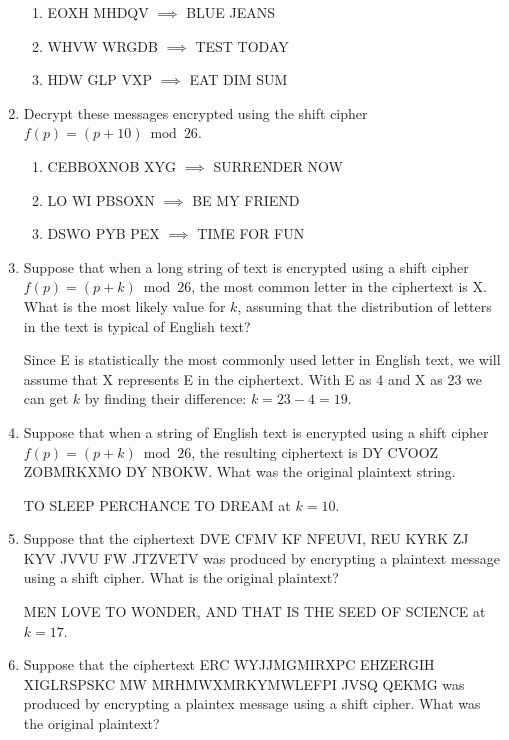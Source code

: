 \documentclass[11pt]{article}
\begin{document}
\begin{enumerate}[label=\textbf{\arabic*.}]
	\begin{enumerate}[label=\textbf{\alph*)}]
		\item EOXH MHDQV $\implies$ BLUE JEANS
		\item WHVW WRGDB $\implies$ TEST TODAY
		\item HDW GLP VXP $\implies$ EAT DIM SUM
	\end{enumerate}

	\item Decrypt these messages encrypted using the shift cipher $f(p) = (p + 10) \bmod 26$.
	
	\begin{enumerate}[label=\textbf{\alph*)}]
		\item CEBBOXNOB XYG $\implies$ SURRENDER NOW
		\item LO WI PBSOXN $\implies$ BE MY FRIEND
		\item DSWO PYB PEX $\implies$ TIME FOR FUN
	\end{enumerate}

	\item Suppose that when a long string of text is encrypted using a shift cipher $f(p) = (p + k) \bmod 26$, the most common letter in the ciphertext is X. What is the most likely value for $k$, assuming that the distribution of letters in the text is typical of English text?
	
	Since E is statistically the most commonly used letter in English text, we will assume that X represents E in the ciphertext. With E as 4 and X as 23 we can get $k$ by finding their difference: $k = 23 - 4 = 19$.
	
	\item Suppose that when a string of English text is encrypted using a shift cipher $f(p) = (p + k) \bmod 26$, the resulting ciphertext is DY CVOOZ ZOBMRKXMO DY NBOKW. What was the original plaintext string.
	
	TO SLEEP PERCHANCE TO DREAM at $k = 10$.
	
	\item Suppose that the ciphertext DVE CFMV KF NFEUVI, REU KYRK ZJ KYV JVVU FW JTZVETV was produced by encrypting a plaintext message using a shift cipher. What is the original plaintext?
	
	MEN LOVE TO WONDER, AND THAT IS THE SEED OF SCIENCE at $k = 17$.
	
	\item Suppose that the ciphertext ERC WYJJMGMIRXPC EHZERGIH XIGLRSPSKC MW MRHMWXMRKYMWLEFPI JVSQ QEKMG was produced by encrypting a plaintex message using a shift cipher. What was the original plaintext?
	

\end{enumerate}
\end{document}
